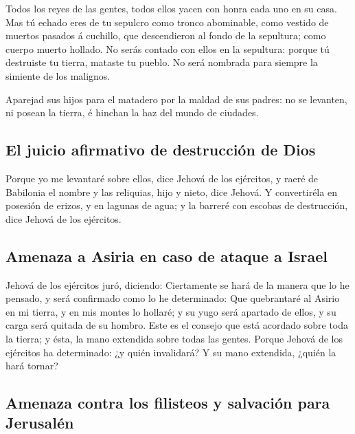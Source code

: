  Todos los reyes de las gentes, todos ellos yacen con honra
cada uno en su casa.  Mas tú echado eres de tu sepulcro
como tronco abominable, como vestido de muertos pasados á cuchillo, que
descendieron al fondo de la sepultura; como cuerpo muerto hollado.
 No serás contado con ellos en la sepultura: porque tú
destruiste tu tierra, mataste tu pueblo. No será nombrada para siempre
la simiente de los malignos.

 Aparejad sus hijos para el matadero por la maldad de sus
padres: no se levanten, ni posean la tierra, é hinchan la haz del mundo
de ciudades.

\hypertarget{el-juicio-afirmativo-de-destrucciuxf3n-de-dios}{%
\subsection{El juicio afirmativo de destrucción de
Dios}\label{el-juicio-afirmativo-de-destrucciuxf3n-de-dios}}

 Porque yo me levantaré sobre ellos, dice Jehová de los
ejércitos, y raeré de Babilonia el nombre y las reliquias, hijo y nieto,
dice Jehová.  Y convertiréla en posesión de erizos, y en
lagunas de agua; y la barreré con escobas de destrucción, dice Jehová de
los ejércitos.

\hypertarget{amenaza-a-asiria-en-caso-de-ataque-a-israel}{%
\subsection{Amenaza a Asiria en caso de ataque a
Israel}\label{amenaza-a-asiria-en-caso-de-ataque-a-israel}}

 Jehová de los ejércitos juró, diciendo: Ciertamente se
hará de la manera que lo he pensado, y será confirmado como lo he
determinado:  Que quebrantaré al Asirio en mi tierra, y en
mis montes lo hollaré; y su yugo será apartado de ellos, y su carga será
quitada de su hombro.  Este es el consejo que está acordado
sobre toda la tierra; y ésta, la mano extendida sobre todas las gentes.
 Porque Jehová de los ejércitos ha determinado: ¿y quién
invalidará? Y su mano extendida, ¿quién la hará tornar?

\hypertarget{amenaza-contra-los-filisteos-y-salvaciuxf3n-para-jerusaluxe9n}{%
\subsection{Amenaza contra los filisteos y salvación para
Jerusalén}\label{amenaza-contra-los-filisteos-y-salvaciuxf3n-para-jerusaluxe9n}}


